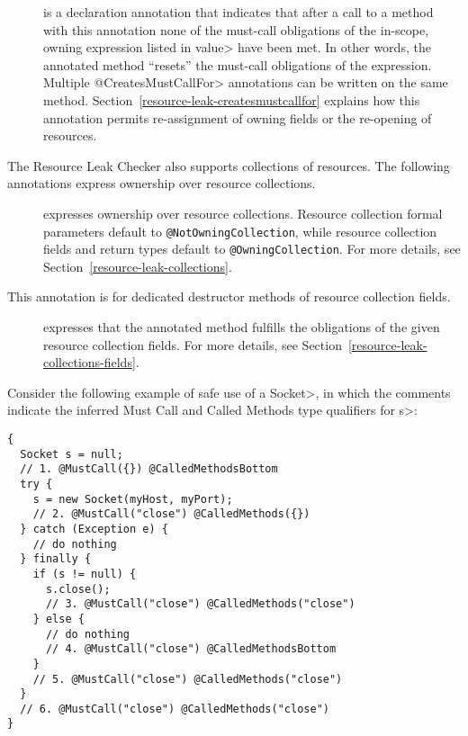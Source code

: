\begin{description}

\item[]
  is a declaration annotation that indicates that after a call to a method
  with this annotation none of the must-call obligations of the in-scope, owning expression
  listed in \<value> have been met.
  In other words, the annotated method ``resets'' the must-call obligations of the expression.
  Multiple \<@CreatesMustCallFor>
  annotations can be written on the same method.  Section~\ref{resource-leak-createsmustcallfor}
  explains how this annotation permits re-assignment of owning
  fields or the re-opening of resources.

\end{description}


The Resource Leak Checker also supports collections of resources. The following annotations express ownership over resource collections.

\begin{description}
\item[]
\item[]
  expresses ownership over resource collections. Resource collection formal parameters default to \texttt{@NotOwningCollection}, while resource collection fields and return types default to \texttt{@OwningCollection}.
  For more details, see Section~\ref{resource-leak-collections}.

\end{description}

This annotation is for dedicated destructor methods of resource collection fields.

\begin{description}
\item[]
  expresses that the annotated method fulfills the obligations of the given resource collection fields.
  For more details, see Section~\ref{resource-leak-collections-fields}.

\end{description}


Consider the following example of safe use of a \<Socket>, in which the comments indicate the
inferred Must Call and Called Methods type qualifiers for \<s>:
\begin{verbatim}
{
  Socket s = null;
  // 1. @MustCall({}) @CalledMethodsBottom
  try {
    s = new Socket(myHost, myPort);
    // 2. @MustCall("close") @CalledMethods({})
  } catch (Exception e) {
    // do nothing
  } finally {
    if (s != null) {
      s.close();
      // 3. @MustCall("close") @CalledMethods("close")
    } else {
      // do nothing
      // 4. @MustCall("close") @CalledMethodsBottom
    }
    // 5. @MustCall("close") @CalledMethods("close")
  }
  // 6. @MustCall("close") @CalledMethods("close")
}
\end{verbatim}

